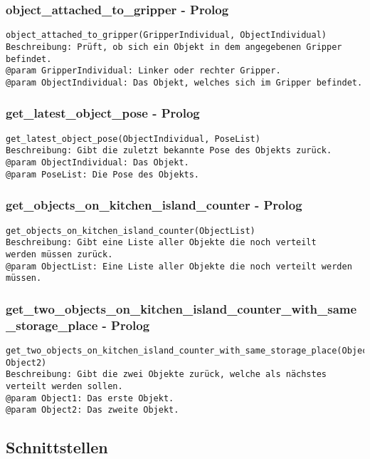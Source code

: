 \documentclass{suturo}
\begin{document}
\subsubsection{object\_attached\_to\_gripper - Prolog}
\begin{verbatim}
object_attached_to_gripper(GripperIndividual, ObjectIndividual)
Beschreibung: Prüft, ob sich ein Objekt in dem angegebenen Gripper befindet.
@param GripperIndividual: Linker oder rechter Gripper.
@param ObjectIndividual: Das Objekt, welches sich im Gripper befindet.
\end{verbatim}

\subsubsection{get\_latest\_object\_pose - Prolog}
\begin{verbatim}
get_latest_object_pose(ObjectIndividual, PoseList)
Beschreibung: Gibt die zuletzt bekannte Pose des Objekts zurück.
@param ObjectIndividual: Das Objekt.
@param PoseList: Die Pose des Objekts.
\end{verbatim}

\subsubsection{get\_objects\_on\_kitchen\_island\_counter - Prolog}
\begin{verbatim}
get_objects_on_kitchen_island_counter(ObjectList)
Beschreibung: Gibt eine Liste aller Objekte die noch verteilt
werden müssen zurück.
@param ObjectList: Eine Liste aller Objekte die noch verteilt werden müssen.
\end{verbatim}

\subsubsection{get\_two\_objects\_on\_kitchen\_island\_counter\_with\_same\_storage\_place - Prolog}
\begin{verbatim}
get_two_objects_on_kitchen_island_counter_with_same_storage_place(Object1, Object2)
Beschreibung: Gibt die zwei Objekte zurück, welche als nächstes verteilt werden sollen.
@param Object1: Das erste Objekt.
@param Object2: Das zweite Objekt.
\end{verbatim}

\subsection*{Schnittstellen}
\end{document}
